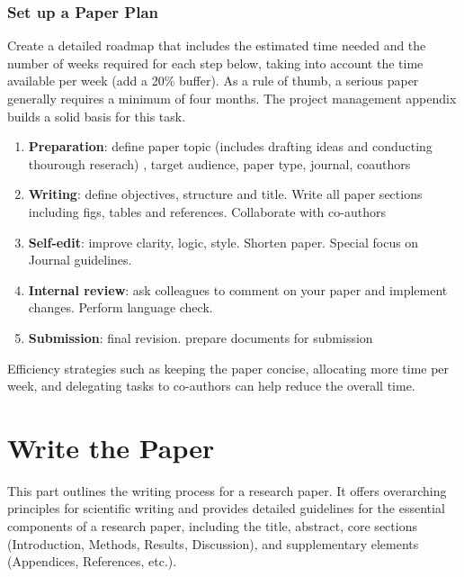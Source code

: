 \documentclass[
    twocolumn,
    fontsize = 10pt,
    parskip = half+,
    headings = small,
    headwidth = text,
    footwidth = text,
]{scrartcl}
\begin{document}
\section{Set up a Paper Plan}
Create a detailed roadmap that includes the estimated time needed and the number of weeks required for each step below, taking into account the time available per week (add a 20\% buffer). 
As a rule of thumb,  a serious paper generally requires a minimum of four months. 
The project management appendix builds a solid basis for this task. 
\begin{enumerate}
    \item \textbf{Preparation}: define paper topic (includes drafting ideas and conducting thourough reserach) , target audience, paper type, journal, coauthors
    \item \textbf{Writing}: define objectives, structure and title. Write all paper sections including figs, tables and references. Collaborate with co-authors
    \item \textbf{Self-edit}: improve clarity, logic, style. Shorten paper. Special focus on Journal guidelines. 
    \item \textbf{Internal review}: ask colleagues to comment on your paper and implement changes. Perform language check. 
    \item \textbf{Submission}: final revision. prepare documents for submission
\end{enumerate}

Efficiency strategies such as keeping the paper concise, allocating more time per week, and delegating tasks to co-authors can help reduce the overall time. 

\part{Write the Paper}

This part outlines the writing process for a research paper. 
It offers overarching principles for scientific writing and provides detailed guidelines for the essential components of a research paper, including the title, abstract, core sections (Introduction, Methods, Results, Discussion), and supplementary elements (Appendices, References, etc.).
\end{document}

